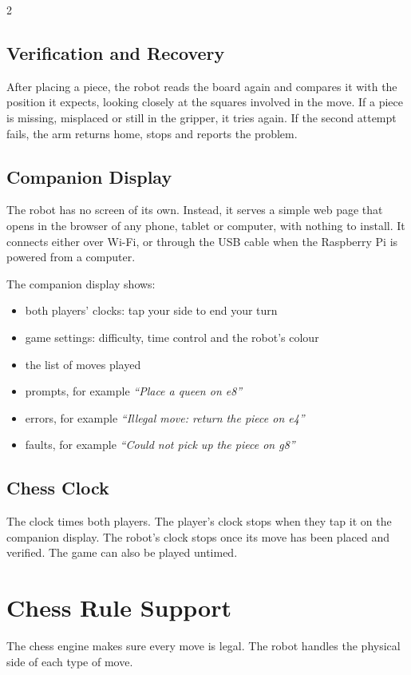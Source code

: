 \documentclass[10pt,a4paper]{article}
\begin{document}
\begin{multicols}{2}
\subsection{Verification and Recovery}
After placing a piece, the robot reads the board again and compares it with the
position it expects, looking closely at the squares involved in the move. If a piece is missing, misplaced or still in the gripper, it tries
again. If the second attempt fails, the arm returns home, stops and reports the problem.

\subsection{Companion Display}
The robot has no screen of its own. Instead, it serves a simple web page that opens in the
browser of any phone, tablet or computer, with nothing to install. It connects either over
Wi-Fi, or through the USB cable when the Raspberry Pi is powered from a computer.

The companion display shows:
\begin{itemize}
  \item both players' clocks: tap your side to end your turn
  \item game settings: difficulty, time control and the robot's colour
  \item the list of moves played
  \item prompts, for example \textit{``Place a queen on e8''}
  \item errors, for example \textit{``Illegal move: return the piece on e4''}
  \item faults, for example \textit{``Could not pick up the piece on g8''}
\end{itemize}

\subsection{Chess Clock}
The clock times both players. The player's clock stops when they tap it on the companion
display. The robot's clock stops once its move has been placed and verified. The game
can also be played untimed.

\section{Chess Rule Support}
The chess engine makes sure every move is legal. The robot handles the physical side of
each type of move.


\end{multicols}
\end{document}
